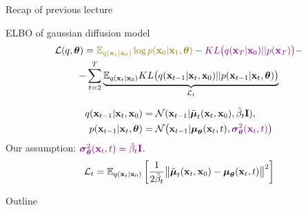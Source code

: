 \begin{frame}{Recap of previous lecture}
	\begin{block}{ELBO of gaussian diffusion model}
		\vspace{-0.7cm}
		\begin{multline*}
			\cL(q, \btheta) =  {\color{olive}\bbE_{q(\bx_1 | \bx_0)} \log p(\bx_0 | \bx_1, \btheta)} - {\color{violet}KL\bigl(q(\bx_T | \bx_0) || p(\bx_T)\bigr)} - \\
			- \sum_{t=2}^T  \underbrace{ \bbE_{q(\bx_t | \bx_0)}KL \bigl(q(\bx_{t-1} | \bx_t, \bx_0) || p(\bx_{t - 1} | \bx_t, \btheta )\bigr)}_{\cL_t}
		\end{multline*}
		\vspace{-1.0cm}
	\end{block}
	\begin{align*}
		q(\mathbf{x}_{t-1} | \mathbf{x}_t, \mathbf{x}_0) &= \mathcal{N}(\mathbf{x}_{t-1} | \tilde{\boldsymbol{\mu}}_t(\mathbf{x}_t, \mathbf{x}_0), \tilde{\beta}_t \mathbf{I}), \\
		p(\mathbf{x}_{t - 1} | \mathbf{x}_t, \boldsymbol{\theta}) &= \mathcal{N} \bigl(\mathbf{x}_{t - 1} | \boldsymbol{\mu}_{\boldsymbol{\theta}}(\mathbf{x}_t, t), {\color{violet}\boldsymbol{\sigma}_{\boldsymbol{\theta}}^2(\mathbf{x}_t, t)}\bigr)
	\end{align*}
	Our assumption:	${\color{violet}\boldsymbol{\sigma}_{\boldsymbol{\theta}}^2(\mathbf{x}_t, t) = \tilde{\beta}_t \mathbf{I}}$.
	\[
		\mathcal{L}_t = \mathbb{E}_{q(\mathbf{x}_t | \mathbf{x}_0)} \left[\frac{1}{2\tilde{\beta}_t} \bigl\| \tilde{\boldsymbol{\mu}}_t(\mathbf{x}_t, \mathbf{x}_0) - \boldsymbol{\mu}_{\boldsymbol{\theta}}(\mathbf{x}_t, t) \bigr\|^2  \right]
	\]
\end{frame}
\begin{frame}{Outline}
	\tableofcontents
\end{frame}
